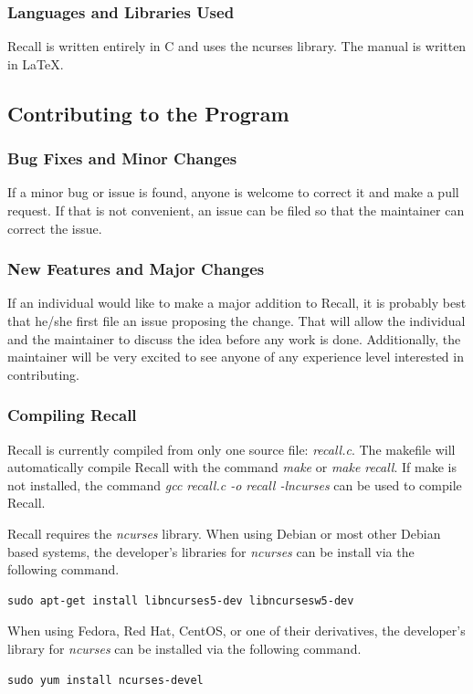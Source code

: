 \documentclass[letterpaper]{article}
\begin{document}
\subsubsection{Languages and Libraries Used}
Recall is written entirely in C and uses the ncurses library. The manual is written in \LaTeX.

\subsection{Contributing to the Program}
\subsubsection{Bug Fixes and Minor Changes}
If a minor bug or issue is found, anyone is welcome to correct it and make a pull request. If that is not convenient, an issue can be filed so that the maintainer can correct the issue.

\subsubsection{New Features and Major Changes}
If an individual would like to make a major addition to Recall, it is probably best that he/she first file an issue proposing the change. That will allow the individual and the maintainer to discuss the idea before any work is done. Additionally, the maintainer will be very excited to see anyone of any experience level interested in contributing.

\subsubsection{Compiling Recall}
Recall is currently compiled from only one source file: \textit{recall.c}. The makefile will automatically compile Recall with the command \textit{make} or \textit{make recall}. If make is not installed, the command \textit{gcc recall.c -o recall -lncurses} can be used to compile Recall.

Recall requires the \textit{ncurses} library. When using Debian or most other Debian based systems, the developer's libraries for \textit{ncurses} can be install via the following command.
\begin{verbatim}
sudo apt-get install libncurses5-dev libncursesw5-dev
\end{verbatim}
When using Fedora, Red Hat, CentOS, or one of their derivatives, the developer's library for \textit{ncurses} can be installed via the following command.
\begin{verbatim}
sudo yum install ncurses-devel
\end{verbatim}
\end{document}
